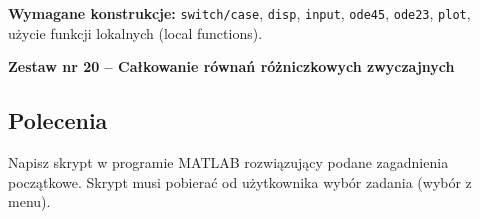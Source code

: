 \documentclass[a4paper,11pt]{article}
\begin{document}
\vspace{0.3cm}
\begin{ramka}
\textbf{Wymagane konstrukcje:}
\texttt{switch/case}, \texttt{disp}, \texttt{input}, \texttt{ode45}, \texttt{ode23}, \texttt{plot}, użycie funkcji lokalnych (local functions).
\end{ramka}

\clearpage
\begin{center}
  {\large\bfseries Zestaw nr 20 \quad -- \quad Całkowanie równań różniczkowych zwyczajnych}
\end{center}
\hrulefill
\vspace{0.4cm}

\subsection*{Polecenia}

Napisz skrypt w programie MATLAB rozwiązujący podane zagadnienia początkowe. Skrypt musi pobierać od użytkownika wybór zadania (wybór z menu).
\end{document}
